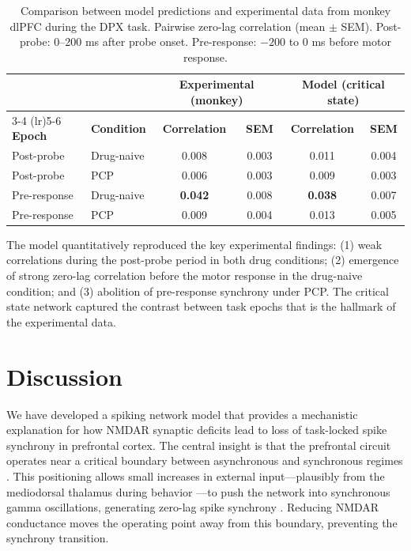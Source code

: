 \documentclass[11pt]{article}
\begin{document}
\begin{table}[H]
\centering
\caption{Comparison between model predictions and experimental data from monkey dlPFC during the DPX task. Pairwise zero-lag correlation (mean $\pm$ SEM). Post-probe: 0--200 ms after probe onset. Pre-response: $-200$ to 0 ms before motor response.}
\label{tab:comparison}
\begin{tabular}{llcccc}
\toprule
& & \multicolumn{2}{c}{\textbf{Experimental (monkey)}} & \multicolumn{2}{c}{\textbf{Model (critical state)}} \\
\cmidrule(lr){3-4} \cmidrule(lr){5-6}
\textbf{Epoch} & \textbf{Condition} & \textbf{Correlation} & \textbf{SEM} & \textbf{Correlation} & \textbf{SEM} \\
\midrule
Post-probe & Drug-naive & 0.008 & 0.003 & 0.011 & 0.004 \\
Post-probe & PCP & 0.006 & 0.003 & 0.009 & 0.003 \\
Pre-response & Drug-naive & \textbf{0.042} & 0.008 & \textbf{0.038} & 0.007 \\
Pre-response & PCP & 0.009 & 0.004 & 0.013 & 0.005 \\
\bottomrule
\end{tabular}
\end{table}

The model quantitatively reproduced the key experimental findings: (1) weak correlations during the post-probe period in both drug conditions; (2) emergence of strong zero-lag correlation before the motor response in the drug-naive condition; and (3) abolition of pre-response synchrony under PCP. The critical state network captured the contrast between task epochs that is the hallmark of the experimental data.

\section{Discussion}

We have developed a spiking network model that provides a mechanistic explanation for how NMDAR synaptic deficits lead to loss of task-locked spike synchrony in prefrontal cortex. The central insight is that the prefrontal circuit operates near a critical boundary between asynchronous and synchronous regimes \citep{brunel2000, brunel2003}. This positioning allows small increases in external input---plausibly from the mediodorsal thalamus during behavior \citep{miller2001}---to push the network into synchronous gamma oscillations, generating zero-lag spike synchrony \citep{fries2005}. Reducing NMDAR conductance moves the operating point away from this boundary, preventing the synchrony transition.
\end{document}
